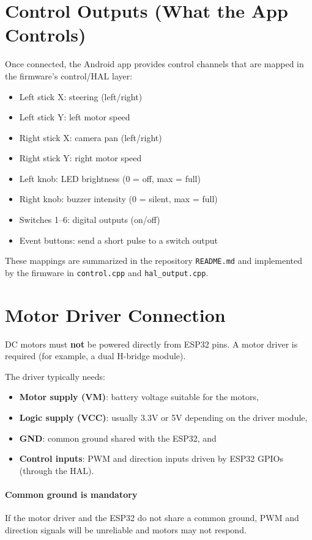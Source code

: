 \section{Control Outputs (What the App Controls)}
\label{sec:hw-control-outputs}

Once connected, the Android app provides control channels that are mapped in the firmware's control/HAL layer:
\begin{itemize}
    \item Left stick X: steering (left/right)
    \item Left stick Y: left motor speed
    \item Right stick X: camera pan (left/right)
    \item Right stick Y: right motor speed
    \item Left knob: LED brightness (0 = off, max = full)
    \item Right knob: buzzer intensity (0 = silent, max = full)
    \item Switches 1--6: digital outputs (on/off)
    \item Event buttons: send a short pulse to a switch output
\end{itemize}

These mappings are summarized in the repository \texttt{README.md} and implemented by the firmware in
\texttt{control.cpp} and \texttt{hal\_output.cpp}.

\section{Motor Driver Connection}
\label{sec:hw-motor-driver}

DC motors must \textbf{not} be powered directly from ESP32 pins. A motor driver is required (for example,
a dual H-bridge module).

The driver typically needs:
\begin{itemize}
    \item \textbf{Motor supply (VM)}: battery voltage suitable for the motors,
    \item \textbf{Logic supply (VCC)}: usually 3.3V or 5V depending on the driver module,
    \item \textbf{GND}: common ground shared with the ESP32, and
    \item \textbf{Control inputs}: PWM and direction inputs driven by ESP32 GPIOs (through the HAL).
\end{itemize}

\paragraph{Common ground is mandatory}
If the motor driver and the ESP32 do not share a common ground, PWM and direction signals will be unreliable
and motors may not respond.

